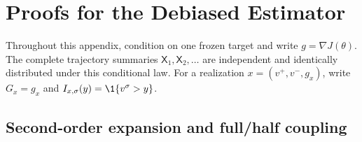 \section{Proofs for the Debiased Estimator}\label{app:estimator}

Throughout this appendix, condition on one frozen target and write
$g=\nabla J(\theta)$.  The complete trajectory summaries $\mathsf X_1,\mathsf X_2,\ldots$ are independent and identically distributed under this conditional law.
For a realization $x=(v^+,v^-,g_x)$, write $G_x=g_x$ and $I_{x,\sigma}(y)=\1\{v^\sigma>y\}$.

\subsection{Second-order expansion and full/half coupling}

